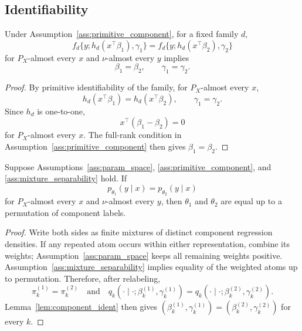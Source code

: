 \subsection{Identifiability}
\label{sec:identifiability}

\begin{lemma}
\label{lem:component_ident}
Under Assumption~\ref{ass:primitive_component}, for a fixed family \(d\),
\[
    f_d\{y;h_d(x^\top\beta_1),\gamma_1\}
    =
    f_d\{y;h_d(x^\top\beta_2),\gamma_2\}
\]
for \(P_X\)-almost every \(x\) and \(\nu\)-almost every \(y\) implies
\[
    \beta_1=\beta_2,
    \qquad
    \gamma_1=\gamma_2.
\]
\end{lemma}

\begin{proof}
By primitive identifiability of the family, for \(P_X\)-almost every \(x\),
\[
    h_d(x^\top\beta_1)=h_d(x^\top\beta_2),
    \qquad
    \gamma_1=\gamma_2.
\]
Since \(h_d\) is one-to-one,
\[
    x^\top(\beta_1-\beta_2)=0
\]
for \(P_X\)-almost every \(x\).  The full-rank condition in
Assumption~\ref{ass:primitive_component} then gives \(\beta_1=\beta_2\).
\end{proof}

\begin{theorem}
\label{thm:fixed_ident}
Suppose Assumptions~\ref{ass:param_space}, \ref{ass:primitive_component}, and
\ref{ass:mixture_separability} hold.  If
\[
    p_{\theta_1}(y\mid x)=p_{\theta_2}(y\mid x)
\]
for \(P_X\)-almost every \(x\) and \(\nu\)-almost every \(y\), then
\(\theta_1\) and \(\theta_2\) are equal up to a permutation of component
labels.
\end{theorem}

\begin{proof}
Write both sides as finite mixtures of distinct component regression densities.
If any repeated atom occurs within either representation, combine its weights;
Assumption~\ref{ass:param_space} keeps all remaining weights positive.
Assumption~\ref{ass:mixture_separability} implies equality of the weighted
atoms up to permutation.  Therefore, after relabeling,
\[
    \pi_k^{(1)}=\pi_k^{(2)}
    \quad\text{and}\quad
    q_k(\cdot\mid\cdot;\beta_k^{(1)},\gamma_k^{(1)})
    =
    q_k(\cdot\mid\cdot;\beta_k^{(2)},\gamma_k^{(2)}).
\]
Lemma~\ref{lem:component_ident} then gives
\((\beta_k^{(1)},\gamma_k^{(1)})
=
(\beta_k^{(2)},\gamma_k^{(2)})\) for every \(k\).
\end{proof}

